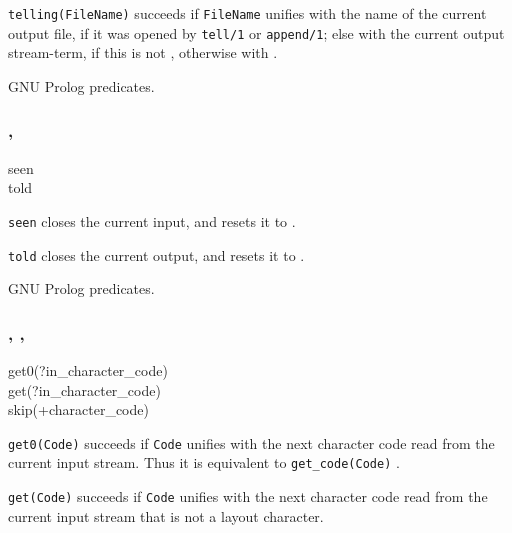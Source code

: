 \texttt{telling(FileName)} succeeds if \texttt{FileName} unifies with the
name of the current output file, if it was opened by \texttt{tell/1} or
\texttt{append/1}; else with the current output stream-term, if this is not
, otherwise with .

\PlErrorsNone

\Portability

GNU Prolog predicates.

\subsubsection{,
               }

\begin{TemplatesOneCol}
seen\\
told

\end{TemplatesOneCol}

\Description

\texttt{seen} closes the current input, and resets it to
.

\texttt{told} closes the current output, and resets it to
.

\PlErrorsNone

\Portability

GNU Prolog predicates.

\subsubsection{,
               ,
               }

\begin{TemplatesOneCol}
get0(?in\_character\_code)\\
get(?in\_character\_code)\\
skip(+character\_code)

\end{TemplatesOneCol}

\Description

\texttt{get0(Code)} succeeds if \texttt{Code} unifies with the next
character code read from the current input stream. Thus it is equivalent to
\texttt{get\_code(Code)} .

\texttt{get(Code)} succeeds if \texttt{Code} unifies with the next character
code read from the current input stream that is not a layout character.

